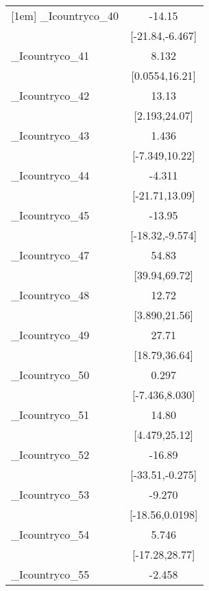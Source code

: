 {\begin{tabular}{l*{1}{c}}
[1em]
\_Icountryco\_40&                -14.15\sym{***}\\
            &       [-21.84,-6.467]         \\
[1em]
\_Icountryco\_41&                 8.132\sym{*}  \\
            &        [0.0554,16.21]         \\
[1em]
\_Icountryco\_42&                 13.13\sym{*}  \\
            &         [2.193,24.07]         \\
[1em]
\_Icountryco\_43&                 1.436         \\
            &        [-7.349,10.22]         \\
[1em]
\_Icountryco\_44&                -4.311         \\
            &        [-21.71,13.09]         \\
[1em]
\_Icountryco\_45&                -13.95\sym{***}\\
            &       [-18.32,-9.574]         \\
[1em]
\_Icountryco\_47&                 54.83\sym{***}\\
            &         [39.94,69.72]         \\
[1em]
\_Icountryco\_48&                 12.72\sym{**} \\
            &         [3.890,21.56]         \\
[1em]
\_Icountryco\_49&                 27.71\sym{***}\\
            &         [18.79,36.64]         \\
[1em]
\_Icountryco\_50&                 0.297         \\
            &        [-7.436,8.030]         \\
[1em]
\_Icountryco\_51&                 14.80\sym{**} \\
            &         [4.479,25.12]         \\
[1em]
\_Icountryco\_52&                -16.89\sym{*}  \\
            &       [-33.51,-0.275]         \\
[1em]
\_Icountryco\_53&                -9.270         \\
            &       [-18.56,0.0198]         \\
[1em]
\_Icountryco\_54&                 5.746         \\
            &        [-17.28,28.77]         \\
[1em]
\_Icountryco\_55&                -2.458         \\

\end{tabular}}

